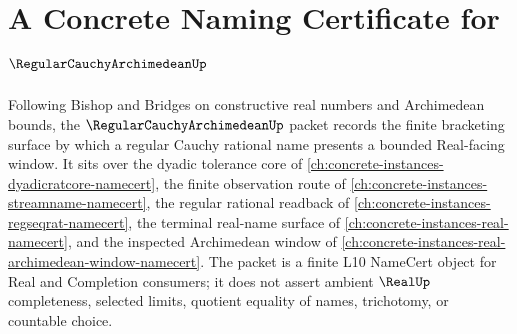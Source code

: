 \chapter{A Concrete Naming Certificate for $\RegularCauchyArchimedeanUp$}
\label{ch:concrete-instances-regular-cauchy-archimedean-namecert}

Following Bishop and Bridges on constructive real numbers and Archimedean bounds, the $\RegularCauchyArchimedeanUp$ packet records the finite bracketing surface by which a regular Cauchy rational name presents a bounded Real-facing window. It sits over the dyadic tolerance core of \autoref{ch:concrete-instances-dyadicratcore-namecert}, the finite observation route of \autoref{ch:concrete-instances-streamname-namecert}, the regular rational readback of \autoref{ch:concrete-instances-regseqrat-namecert}, the terminal real-name surface of \autoref{ch:concrete-instances-real-namecert}, and the inspected Archimedean window of \autoref{ch:concrete-instances-real-archimedean-window-namecert}. The packet is a finite L10 NameCert object for Real and Completion consumers; it does not assert ambient $\RealUp$ completeness, selected limits, quotient equality of names, trichotomy, or countable choice.

